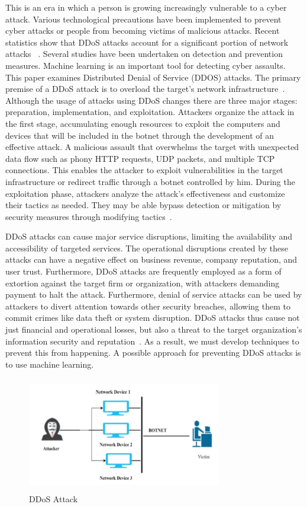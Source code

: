 \documentclass[conference]{IEEEtran}
\begin{document}
This is an era in which a person is growing increasingly vulnerable to a cyber attack.  Various technological precautions have been implemented to prevent cyber attacks or people from becoming victims of malicious attacks.  Recent statistics show that DDoS attacks account for a significant portion of network attacks ~\cite{1}.  Several studies have been undertaken on detection and prevention measures.  Machine learning is an important tool for detecting cyber assaults.  This paper examines Distributed Denial of Service (DDOS) attacks.  The primary premise of a DDoS attack is to overload the target's network infrastructure~\cite{2}.  Although the usage of attacks using DDoS changes there are three major stages: preparation, implementation, and exploitation.  Attackers organize the attack in the first stage, accumulating enough resources to exploit the computers and devices that will be included in the botnet through the development of an effective attack.  A malicious assault that overwhelms the target with unexpected data flow such as phony HTTP requests, UDP packets, and multiple TCP connections.  This enables the attacker to exploit vulnerabilities in the target infrastructure or redirect traffic through a botnet controlled by him.  During the exploitation phase, attackers analyze the attack's effectiveness and customize their tactics as needed.  They may be able bypass detection or mitigation by security measures through modifying tactics~\cite{3}.  

DDoS attacks can cause major service disruptions, limiting the availability and accessibility of targeted services.  The operational disruptions created by these attacks can have a negative effect on business revenue, company reputation, and user trust.  Furthermore, DDoS attacks are frequently employed as a form of extortion against the target firm or organization, with attackers demanding payment to halt the attack.  Furthermore, denial of service attacks can be used by attackers to divert attention towards other security breaches, allowing them to commit crimes like data theft or system disruption.  DDoS attacks thus cause not just financial and operational losses, but also a threat to the target organization's information security and reputation~\cite{4}.  As a result, we must develop techniques to prevent this from happening. A possible approach for preventing DDoS attacks is to use machine learning.
\begin{figure}[ht]
    \centering
    \includegraphics[height=5cm,width=8.5cm]{DDoS_Photo.JPG}
    \caption{DDoS Attack~\cite{11}} 
    \label{fig1}
\end{figure}
\end{document}
